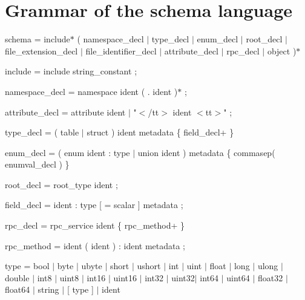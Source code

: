\chapter{Grammar of the schema language}
\hypertarget{flatbuffers_grammar}{}\label{flatbuffers_grammar}
schema = include\texorpdfstring{$\ast$}{*} ( namespace\+\_\+decl \texorpdfstring{$\vert$}{|} type\+\_\+decl \texorpdfstring{$\vert$}{|} enum\+\_\+decl \texorpdfstring{$\vert$}{|} root\+\_\+decl \texorpdfstring{$\vert$}{|} file\+\_\+extension\+\_\+decl \texorpdfstring{$\vert$}{|} file\+\_\+identifier\+\_\+decl \texorpdfstring{$\vert$}{|} attribute\+\_\+decl \texorpdfstring{$\vert$}{|} rpc\+\_\+decl \texorpdfstring{$\vert$}{|} object )\texorpdfstring{$\ast$}{*}

include = {\ttfamily include} string\+\_\+constant {\ttfamily ;}

namespace\+\_\+decl = {\ttfamily namespace} ident ( {\ttfamily .} ident )\texorpdfstring{$\ast$}{*} {\ttfamily ;}

attribute\+\_\+decl = {\ttfamily attribute} ident \texorpdfstring{$\vert$}{|} {\ttfamily "{}$<$/tt$>$ ident $<$tt$>$"{}} {\ttfamily ;}

type\+\_\+decl = ( {\ttfamily table} \texorpdfstring{$\vert$}{|} {\ttfamily struct} ) ident metadata {\ttfamily \{} field\+\_\+decl+ {\ttfamily \}}

enum\+\_\+decl = ( {\ttfamily enum} ident {\ttfamily \+:} type \texorpdfstring{$\vert$}{|} {\ttfamily union} ident ) metadata {\ttfamily \{} commasep( enumval\+\_\+decl ) {\ttfamily \}}

root\+\_\+decl = {\ttfamily root\+\_\+type} ident {\ttfamily ;}

field\+\_\+decl = ident {\ttfamily \+:} type \mbox{[} {\ttfamily =} scalar \mbox{]} metadata {\ttfamily ;}

rpc\+\_\+decl = {\ttfamily rpc\+\_\+service} ident {\ttfamily \{} rpc\+\_\+method+ {\ttfamily \}}

rpc\+\_\+method = ident {\ttfamily (} ident {\ttfamily )} {\ttfamily \+:} ident metadata {\ttfamily ;}

type = {\ttfamily bool} \texorpdfstring{$\vert$}{|} {\ttfamily byte} \texorpdfstring{$\vert$}{|} {\ttfamily ubyte} \texorpdfstring{$\vert$}{|} {\ttfamily short} \texorpdfstring{$\vert$}{|} {\ttfamily ushort} \texorpdfstring{$\vert$}{|} {\ttfamily int} \texorpdfstring{$\vert$}{|} {\ttfamily uint} \texorpdfstring{$\vert$}{|} {\ttfamily float} \texorpdfstring{$\vert$}{|} {\ttfamily long} \texorpdfstring{$\vert$}{|} {\ttfamily ulong} \texorpdfstring{$\vert$}{|} {\ttfamily double} \texorpdfstring{$\vert$}{|} {\ttfamily int8} \texorpdfstring{$\vert$}{|} {\ttfamily uint8} \texorpdfstring{$\vert$}{|} {\ttfamily int16} \texorpdfstring{$\vert$}{|} {\ttfamily uint16} \texorpdfstring{$\vert$}{|} {\ttfamily int32} \texorpdfstring{$\vert$}{|} {\ttfamily uint32}\texorpdfstring{$\vert$}{|} {\ttfamily int64} \texorpdfstring{$\vert$}{|} {\ttfamily uint64} \texorpdfstring{$\vert$}{|} {\ttfamily float32} \texorpdfstring{$\vert$}{|} {\ttfamily float64} \texorpdfstring{$\vert$}{|} {\ttfamily string} \texorpdfstring{$\vert$}{|} {\ttfamily \mbox{[}} type {\ttfamily \mbox{]}} \texorpdfstring{$\vert$}{|} ident

